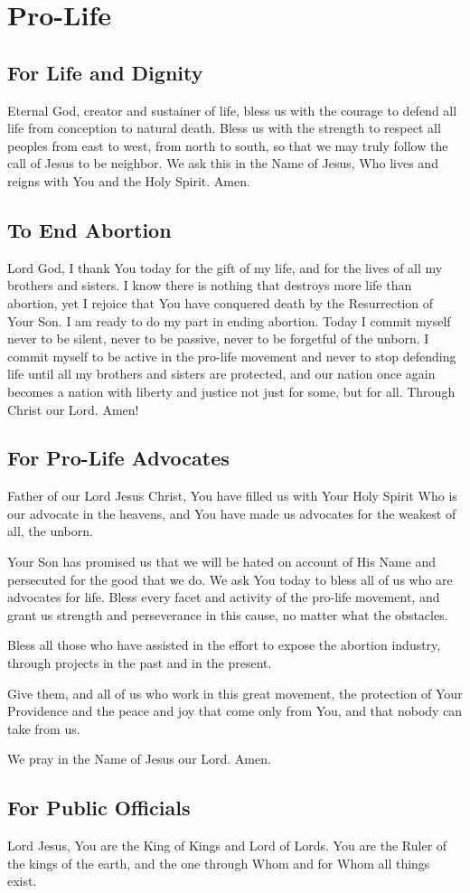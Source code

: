 \documentclass[12pt]{article}
\newcommand{\prayersection}[1]{\section{#1}}
\newcommand{\prayertitle}[1]{\subsection{#1}}
\begin{document}
\prayersection{Pro-Life}
\prayertitle{For Life and Dignity}
\label{prayer:life-dignity}
Eternal God, creator and sustainer of life, bless us with the courage to defend all life from conception to natural death.
Bless us with the strength to respect all peoples from east to west, from north to south,
so that we may truly follow the call of Jesus to be neighbor.
We ask this in the Name of Jesus, Who lives and reigns with You and the Holy Spirit.
Amen.

\prayertitle{To End Abortion}
Lord God, I thank You today for the gift of my life, and for the lives of all my brothers and sisters.
I know there is nothing that destroys more life than abortion, yet I rejoice that You have conquered death by the Resurrection of Your Son. 
I am ready to do my part in ending abortion. Today I commit myself 
never to be silent, 
never to be passive, 
never to be forgetful of the unborn. 
I commit myself to be active in the pro-life movement and never to stop defending life until all my brothers and sisters are protected, and our nation once again becomes a nation with liberty and justice not just for some, but for all.
Through Christ our Lord. Amen!

\prayertitle{For Pro-Life Advocates}
Father of our Lord Jesus Christ,
You have filled us with Your Holy Spirit Who is our advocate in the heavens, and You have made us advocates for the weakest of all, the unborn.

Your Son has promised us that we will be hated on account of His Name and persecuted for the good that we do.
We ask You today to bless all of us who are advocates for life.
Bless every facet and activity of the pro-life movement, and grant us strength and perseverance in this cause, no matter what the obstacles.

Bless all those who have assisted in the effort to expose the abortion industry, through projects in the past and in the present.

Give them, and all of us who work in this great movement, the protection of Your Providence and the peace and joy that come only from You, and that nobody can take from us.

We pray in the Name of Jesus our Lord. Amen.

\prayertitle{For Public Officials}
Lord Jesus,
You are the King of Kings and Lord of Lords.
You are the Ruler of the kings of the earth, and the one through Whom and for Whom all things exist.
\end{document}
